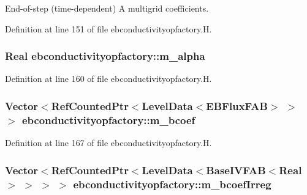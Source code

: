 End-\/of-\/step (time-\/dependent) A multigrid coefficients. 



Definition at line 151 of file ebconductivityopfactory.\+H.

\subsubsection[{\texorpdfstring{m\+\_\+alpha}{m_alpha}}]{\setlength{\rightskip}{0pt plus 5cm}Real ebconductivityopfactory\+::m\+\_\+alpha\hspace{0.3cm}{\ttfamily [protected]}}\hypertarget{classebconductivityopfactory_a5eb1cba3b9bab4962dbc60c83a3da7d7}{}\label{classebconductivityopfactory_a5eb1cba3b9bab4962dbc60c83a3da7d7}


Definition at line 160 of file ebconductivityopfactory.\+H.

\subsubsection[{\texorpdfstring{m\+\_\+bcoef}{m_bcoef}}]{\setlength{\rightskip}{0pt plus 5cm}Vector$<$Ref\+Counted\+Ptr$<$Level\+Data$<$E\+B\+Flux\+F\+AB$>$ $>$ $>$ ebconductivityopfactory\+::m\+\_\+bcoef\hspace{0.3cm}{\ttfamily [protected]}}\hypertarget{classebconductivityopfactory_a5f8b23e2129e54a5a726d87610d84499}{}\label{classebconductivityopfactory_a5f8b23e2129e54a5a726d87610d84499}


Definition at line 167 of file ebconductivityopfactory.\+H.

\subsubsection[{\texorpdfstring{m\+\_\+bcoef\+Irreg}{m_bcoefIrreg}}]{\setlength{\rightskip}{0pt plus 5cm}Vector$<$Ref\+Counted\+Ptr$<$Level\+Data$<$Base\+I\+V\+F\+AB$<$Real$>$ $>$ $>$ $>$ ebconductivityopfactory\+::m\+\_\+bcoef\+Irreg\hspace{0.3cm}{\ttfamily [protected]}}\hypertarget{classebconductivityopfactory_a65ca5d13540ca15c8c06e23f91b26b2d}{}\label{classebconductivityopfactory_a65ca5d13540ca15c8c06e23f91b26b2d}



